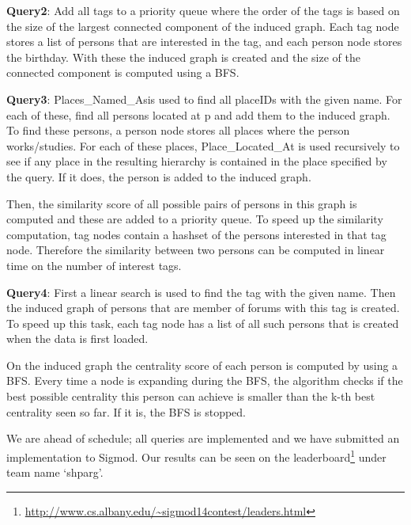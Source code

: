 \documentclass{article}
\begin{document}
\textbf{Query2}: Add all tags to a priority queue where the order of
the tags is based on the size of the largest connected component of
the induced graph. Each tag node stores a list of persons that are
interested in the tag, and each person node stores the birthday. With
these the induced graph is created and the size of the connected
component is computed using a BFS.
              
\textbf{Query3}: Places\_Named\_Asis used to find all placeIDs with
the given name. For each of these, find all persons located at p and
add them to the induced graph. To find these persons, a person node
stores all places where the person works/studies. For each of these
places, Place\_Located\_At is used recursively to see if any place in
the resulting hierarchy is contained in the place specified by the
query. If it does, the person is added to the induced graph.
              
Then, the similarity score of all possible pairs of persons in this
graph is computed and these are added to a priority queue. To speed up
the similarity computation, tag nodes contain a hashset of the persons
interested in that tag node. Therefore the similarity between two
persons can be computed in linear time on the number of interest tags.
              
\textbf{Query4}: First a linear search is used to find the tag with
the given name. Then the induced graph of persons that are member of
forums with this tag is created. To speed up this task, each tag node
has a list of all such persons that is created when the data is first
loaded.
               
On the induced graph the centrality score of each person is computed
by using a BFS. Every time a node is expanding during the BFS, the
algorithm checks if the best possible centrality this person can
achieve is smaller than the k-th best centrality seen so far. If it
is, the BFS is stopped.
    
We are ahead of schedule; all queries are implemented and we have
submitted an implementation to Sigmod.  Our results can be seen on the
leaderboard\footnote{\url{http://www.cs.albany.edu/~sigmod14contest/leaders.html}} under team name `shparg'.
\end{document}
